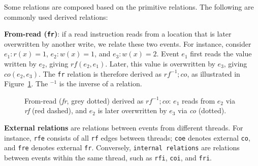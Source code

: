 Some relations are composed based on the primitive relations. The following are commonly used derived relations:

\textbf{From-read (\texttt{fr})}: if a read instruction reads from a location that is later overwritten by another write, we relate these two events. For instance, consider $e_1 : r(x) = 1$, $e_2 : w(x) = 1$, and $e_3 : w(x) = 2$. Event $e_1$ first reads the value written by $e_2$, giving $\mathit{rf}(e_2, e_1)$. Later, this value is overwritten by $e_3$, giving $\mathit{co}(e_2, e_3)$. The \texttt{fr} relation is therefore derived as $\mathit{rf}^{-1}\mathbin{;}\mathit{co}$, as illustrated in Figure~\ref{fig:fr-example}. The $^{-1}$ is the inverse of a relation.

\begin{figure}[htbp]
\centering
{}
\caption{From-read (\textit{fr}, grey dotted) derived as $\mathit{rf}^{-1}\mathbin{;}\mathit{co}$: $e_1$ reads from $e_2$ via \textit{rf} (red dashed), and $e_2$ is later overwritten by $e_3$ via \textit{co} (dotted).}
\label{fig:fr-example}
\end{figure}

\textbf{External relations} are relations between events from different threads. For instance, \texttt{rfe} consists of all \texttt{rf} edges between threads; \texttt{coe} denotes external \texttt{co}, and \texttt{fre} denotes external \texttt{fr}. Conversely, \texttt{internal relations} are relations between events within the same thread, such as \texttt{rfi}, \texttt{coi}, and \texttt{fri}.

